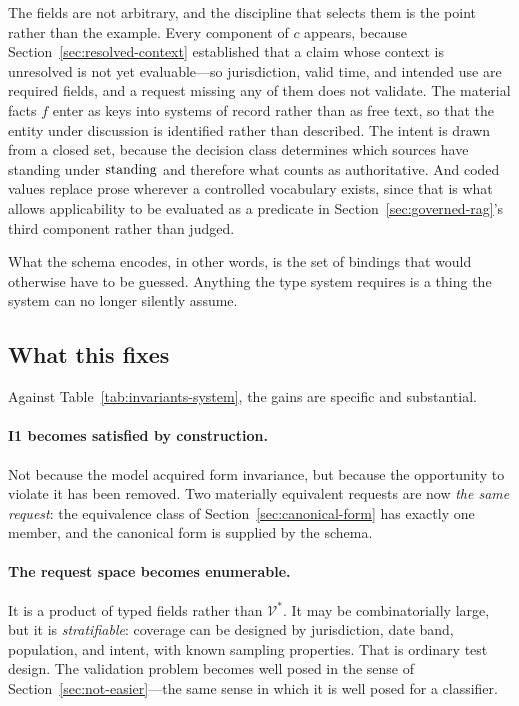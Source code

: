 The fields are not arbitrary, and the discipline that selects them is the point rather
than the example. Every component of $c$ appears, because
Section~\ref{sec:resolved-context} established that a claim whose context is unresolved is
not yet evaluable---so jurisdiction, valid time, and intended use are required fields, and
a request missing any of them does not validate. The material facts $f$ enter as keys into
systems of record rather than as free text, so that the entity under discussion is
identified rather than described. The intent is drawn from a closed set, because the
decision class determines which sources have standing under $\operatorname{standing}$ and therefore what
counts as authoritative. And coded values replace prose wherever a controlled vocabulary
exists, since that is what allows applicability to be evaluated as a predicate in
Section~\ref{sec:governed-rag}'s third component rather than judged.

What the schema encodes, in other words, is the set of bindings that would otherwise have
to be guessed. Anything the type system requires is a thing the system can no longer
silently assume.

\subsection{What this fixes}

Against Table~\ref{tab:invariants-system}, the gains are specific and substantial.

\paragraph{I1 becomes satisfied by construction.} Not because the model acquired form
invariance, but because the opportunity to violate it has been removed. Two
materially equivalent requests are now \emph{the same request}: the equivalence class
of Section~\ref{sec:canonical-form} has exactly one member, and the canonical form is
supplied by the schema.

\paragraph{The request space becomes enumerable.} It is a product of typed fields
rather than $\mathcal{V}^{*}$. It may be combinatorially large, but it is
\emph{stratifiable}: coverage can be designed by jurisdiction, date band, population,
and intent, with known sampling properties. That is ordinary test design. The
validation problem becomes well posed in the sense of
Section~\ref{sec:not-easier}---the same sense in which it is well posed for a
classifier.

